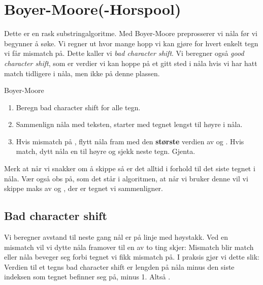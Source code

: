 \section{Boyer-Moore(-Horspool)}
Dette er en rask substringalgoritme. Med Boyer-Moore preprosserer vi nåla før vi begynner å søke. Vi regner ut hvor mange hopp vi kan gjøre for hvert enkelt tegn vi får mismatch på. Dette kaller vi \textit{bad character shift}. Vi beregner også \textit{good character shift}, som er verdier vi kan hoppe på et gitt sted i nåla hvis vi har hatt match tidligere i nåla, men ikke på denne plassen. 
\newpage
\begin{theorem} Boyer-Moore
	\begin{enumerate}
		\item Beregn bad character shift for alle tegn.
		\item Sammenlign nåla med teksten, starter med tegnet lengst til høyre i nåla.
		\item Hvis mismatch på , flytt nåla fram med den \textbf{største} verdien av  og . Hvis match, dytt nåla en til høyre og sjekk neste tegn. Gjenta.
	\end{enumerate}
\end{theorem}
Merk at når vi snakker om å skippe så er det alltid i forhold til det siste tegnet i nåla. Vær også obs på, som det står i algoritmen, at når vi bruker denne vil vi skippe maks av  og , der  er tegnet vi sammenligner.

\subsection{Bad character shift}
Vi beregner avstand til neste gang nål er på linje med høystakk.
Ved en mismatch vil vi dytte nåla framover til en av to ting skjer: Mismatch blir match eller nåla beveger seg forbi tegnet vi fikk mismatch på.
I praksis gjør vi dette slik: Verdien til et tegns bad character shift er lengden på nåla minus den siste indeksen som tegnet befinner seg på, minus 1. Altså .

